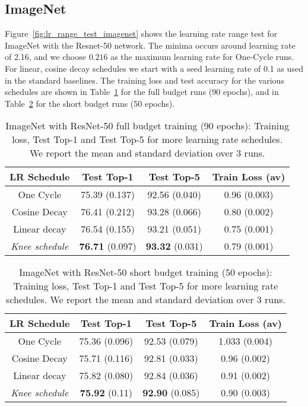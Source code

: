 \documentclass[twoside,11pt]{article}
\newcommand{\lrschedule}{\textit{Knee schedule}}
\begin{document}
\subsection{ImageNet}
Figure~\ref{fig:lr_range_test_imagenet} shows the learning rate range test for ImageNet with the Resnet-50 network. The minima occurs around learning rate of 2.16, and we choose $0.216$ as the maximum learning rate for One-Cycle runs. For linear, cosine decay schedules we start with a seed learning rate of 0.1 as used in the standard baselines. The training loss and test accuracy for the various schedules are shown in Table~\ref{tab:ImageNet_full_budget_runs} for the full budget runs (90 epochs), and in Table~\ref{tab:ImageNet_short_budget_runs} for the short budget runs (50 epochs).

\begin{table}[h]
\small
\centering
\caption{ImageNet with ResNet-50 full budget training (90 epochs): Training loss, Test Top-1 and Test Top-5 for more learning rate schedules. We report the mean and standard deviation over 3 runs.}
\label{tab:ImageNet_full_budget_runs}
\begin{tabular}{cccc}
  \toprule
  LR Schedule    & Test Top-1  & Test Top-5  & Train Loss (av) \\ 
  \midrule
  One Cycle        & 75.39 (0.137) & 92.56 (0.040) & 0.96 (0.003) \\
  Cosine Decay      & 76.41 (0.212) & 93.28 (0.066) & 0.80 (0.002) \\
  Linear decay     &  76.54 (0.155) & 93.21 (0.051)  & 0.75 (0.001)\\
  \lrschedule{}     & \textbf{76.71} (0.097)  & \textbf{93.32} (0.031) & 0.79 (0.001) \\ \bottomrule
\end{tabular}

\end{table}
\begin{table}[h!]
\small
\centering
\caption{ImageNet with ResNet-50 short budget training (50 epochs): Training loss, Test Top-1 and Test Top-5 for more learning rate schedules. We report the mean and standard deviation over 3 runs.}
\label{tab:ImageNet_short_budget_runs}
\begin{tabular}{cccc}
  \toprule
  LR Schedule    & Test Top-1  & Test Top-5  & Train Loss (av) \\ 
  \midrule
  One Cycle        & 75.36 (0.096) & 92.53 (0.079) & 1.033 (0.004)\\
  Cosine Decay     & 75.71 (0.116) & 92.81 (0.033) & 0.96 (0.002) \\
  Linear decay     & 75.82 (0.080) & 92.84 (0.036) & 0.91 (0.002) \\
  \lrschedule{}    & \textbf{75.92} (0.11) & \textbf{92.90} (0.085) & 0.90 (0.003) \\
\bottomrule
\end{tabular}

\end{table}
\end{document}
